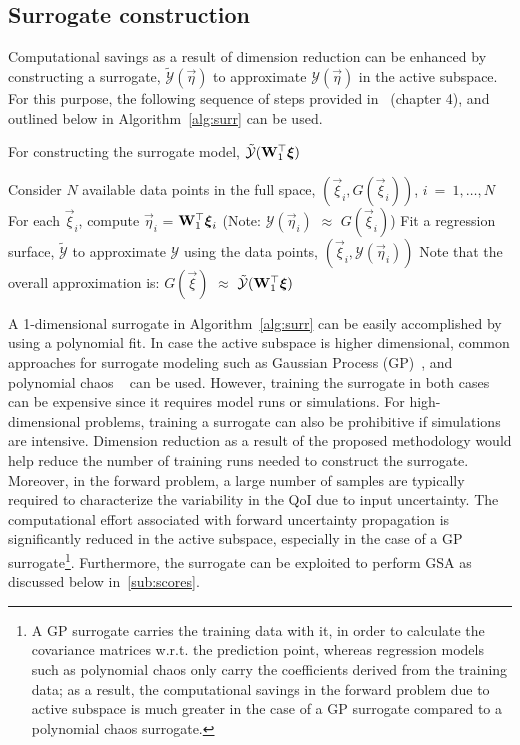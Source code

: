 \subsection{Surrogate construction}
\label{sub:surr_sub}

Computational savings as a result of dimension reduction can be enhanced by
constructing a surrogate, $\tilde{\mathcal{Y}}(\vec{\eta})$ to approximate $\mathcal{Y}(\vec{\eta})$
in the active subspace. For this purpose, the following sequence of steps
provided in~\cite{Constantine:2015} (chapter 4), and outlined below in Algorithm~\ref{alg:surr}
can be used.
\bigskip
\begin{breakablealgorithm}
\renewcommand{\algorithmicrequire}{\textbf{Input:}}
\renewcommand{\algorithmicensure}{\textbf{Output:}}
  \caption{For constructing the surrogate model, $\tilde{\mathcal{Y}}(\mat{W}_1^\top\vec\xi)$}
  \begin{algorithmic}[1]
	  \State Consider $N$ available data points in the full space, $(\vec\xi_i,G(\vec\xi_i))$, $i~=~1,\ldots,N$
	  \State For each $\vec\xi_i$, compute $\vec\eta_i$ = $\mat{W}_1^\top\vec\xi_i$ 
          (Note: $\mathcal{Y}(\vec{\eta}_i)$ $\approx$ $G(\vec{\xi}_i)$)
	  \State Fit a regression surface, $\tilde{\mathcal{Y}}$ to approximate $\mathcal{Y}$ using the data
                 points, $(\vec\xi_i,\mathcal{Y}(\vec\eta_i))$
	  \State Note that the overall approximation is: $G(\vec{\xi})$ $\approx$
                 $\tilde{\mathcal{Y}}(\mat{W}_1^\top\vec{\xi})$ 
	\EndProcedure
  \end{algorithmic}
  \label{alg:surr}
\end{breakablealgorithm}
\bigskip

A 1-dimensional surrogate in Algorithm~\ref{alg:surr} can be easily accomplished by using a polynomial fit. 
In case the active subspace is higher dimensional, 
common approaches for surrogate modeling such as Gaussian Process 
(GP)~\cite{Rasmussen:2004}, and 
polynomial chaos ~\cite{Ghanem:1990, Xiu:2002} can be used. However, training the surrogate
in both cases can be expensive since it requires model runs or simulations. For high-dimensional
problems, training a surrogate can also be prohibitive if simulations are intensive. Dimension
reduction as a result of the proposed methodology would help reduce the number of training runs needed
to construct the surrogate. Moreover, in the forward problem, a large number of samples are typically
required to characterize the variability in the QoI due to input uncertainty. The computational
effort associated with forward uncertainty propagation is significantly reduced in the active subspace,
especially in the case of a GP surrogate\footnote{A GP surrogate carries the training data with it, in
order to calculate the covariance matrices w.r.t. the prediction point, whereas regression models such as
polynomial chaos only carry the coefficients derived from the training data; as a result, the computational
savings in the forward problem due to active subspace is much greater in the case of a GP surrogate
compared to a polynomial chaos surrogate.}. Furthermore, the surrogate can be exploited to perform GSA
as discussed below in~\ref{sub:scores}. 

